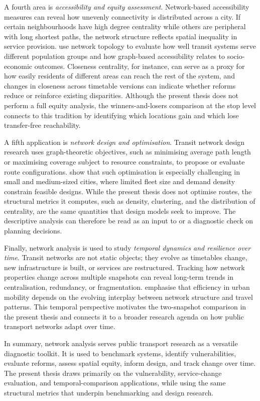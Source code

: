 \documentclass[12pt,a4paper,oneside]{report}
\begin{document}
A fourth area is \emph{accessibility and equity assessment}.
Network-based accessibility measures can reveal how unevenly connectivity is distributed across a city.
If certain neighbourhoods have high degree centrality while others are peripheral with long shortest paths, the network structure reflects spatial inequality in service provision.
\citet{welch2013} use network topology to evaluate how well transit systems serve different population groups and how graph-based accessibility relates to socio-economic outcomes.
Closeness centrality, for instance, can serve as a proxy for how easily residents of different areas can reach the rest of the system, and changes in closeness across timetable versions can indicate whether reforms reduce or reinforce existing disparities.
Although the present thesis does not perform a full equity analysis, the winners-and-losers comparison at the stop level connects to this tradition by identifying which locations gain and which lose transfer-free reachability.

A fifth application is \emph{network design and optimisation}.
Transit network design research uses graph-theoretic objectives, such as minimising average path length or maximising coverage subject to resource constraints, to propose or evaluate route configurations.
\citet{cipriani2019} show that such optimisation is especially challenging in small and medium-sized cities, where limited fleet size and demand density constrain feasible designs.
While the present thesis does not optimise routes, the structural metrics it computes, such as density, clustering, and the distribution of centrality, are the same quantities that design models seek to improve.
The descriptive analysis can therefore be read as an input to or a diagnostic check on planning decisions.

Finally, network analysis is used to study \emph{temporal dynamics and resilience over time}.
Transit networks are not static objects; they evolve as timetables change, new infrastructure is built, or services are restructured.
Tracking how network properties change across multiple snapshots can reveal long-term trends in centralisation, redundancy, or fragmentation.
\citet{gallotti2014} emphasise that efficiency in urban mobility depends on the evolving interplay between network structure and travel patterns.
This temporal perspective motivates the two-snapshot comparison in the present thesis and connects it to a broader research agenda on how public transport networks adapt over time.

In summary, network analysis serves public transport research as a versatile diagnostic toolkit.
It is used to benchmark systems, identify vulnerabilities, evaluate reforms, assess spatial equity, inform design, and track change over time.
The present thesis draws primarily on the vulnerability, service-change evaluation, and temporal-comparison applications, while using the same structural metrics that underpin benchmarking and design research.
\end{document}
